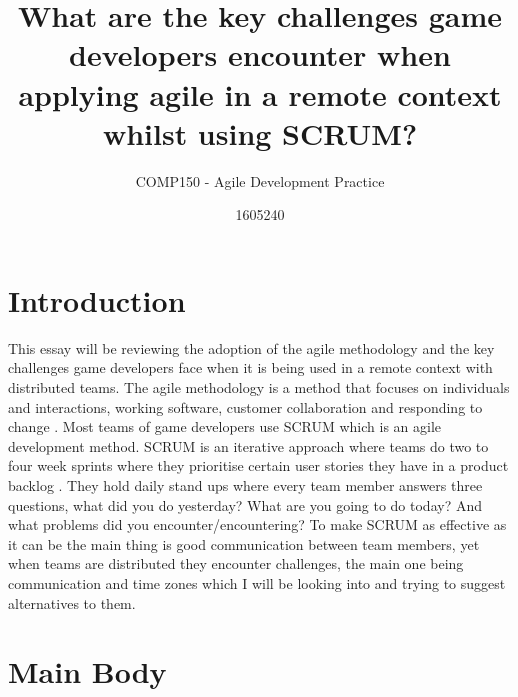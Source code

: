 \documentclass{scrartcl}
\title{What are the key challenges game developers encounter when applying agile in a remote context whilst using SCRUM?}
\subtitle{COMP150 - Agile Development Practice}
\author{1605240}
\begin{document}
\maketitle


\section{Introduction}

This essay will be reviewing the adoption of the agile methodology and the key challenges game developers face when it is being used in a remote context with distributed teams. The agile methodology is a method that focuses on individuals and interactions, working software, customer collaboration and responding to change \cite{HighsmithFowler2001} . Most teams of game developers use SCRUM which is an agile development method. SCRUM is an iterative approach where teams do two to four week sprints where they prioritise certain user stories they have in a product backlog \cite{6005502}. They hold daily stand ups where every team member answers three questions, what did you do yesterday? What are you going to do today? And what problems did you encounter/encountering?\cite{6005502} To make SCRUM as effective as it can be the main thing is good communication between team members, yet when teams are distributed they encounter challenges, the main one being communication and time zones which I will be looking into and trying to suggest alternatives to them.

\section{Main Body}
\end{document}
